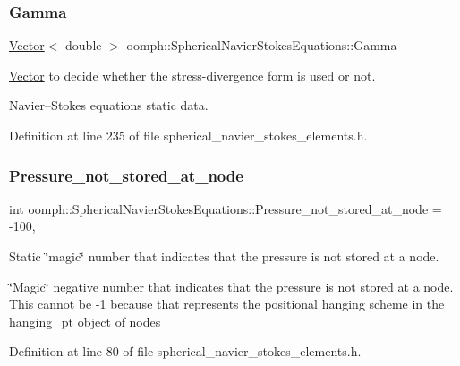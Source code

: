\subsubsection{\texorpdfstring{Gamma}{Gamma}}
{\footnotesize\ttfamily \hyperlink{classoomph_1_1Vector}{Vector}$<$ double $>$ oomph\+::\+Spherical\+Navier\+Stokes\+Equations\+::\+Gamma\hspace{0.3cm}{\ttfamily [static]}}



\hyperlink{classoomph_1_1Vector}{Vector} to decide whether the stress-\/divergence form is used or not. 

Navier--Stokes equations static data. 

Definition at line 235 of file spherical\+\_\+navier\+\_\+stokes\+\_\+elements.\+h.

\mbox{\label{classoomph_1_1SphericalNavierStokesEquations_a6e9d12a0f822100dea121402eabcab1d}} 
\subsubsection{\texorpdfstring{Pressure\+\_\+not\+\_\+stored\+\_\+at\+\_\+node}{Pressure\_not\_stored\_at\_node}}
{\footnotesize\ttfamily int oomph\+::\+Spherical\+Navier\+Stokes\+Equations\+::\+Pressure\+\_\+not\+\_\+stored\+\_\+at\+\_\+node = -\/100\hspace{0.3cm}{\ttfamily [static]}, {\ttfamily [private]}}



Static \char`\"{}magic\char`\"{} number that indicates that the pressure is not stored at a node. 

\char`\"{}\+Magic\char`\"{} negative number that indicates that the pressure is not stored at a node. This cannot be -\/1 because that represents the positional hanging scheme in the hanging\+\_\+pt object of nodes 

Definition at line 80 of file spherical\+\_\+navier\+\_\+stokes\+\_\+elements.\+h.



